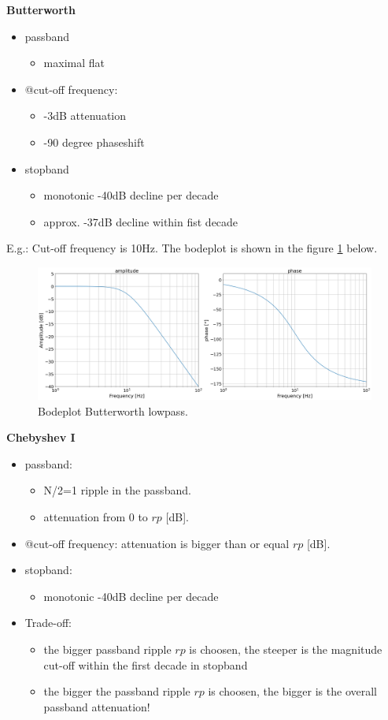 
\textbf{Butterworth}
\begin{itemize}
    \item passband
    \begin{itemize}
        \item maximal flat
    \end{itemize}
    \item @cut-off frequency:
    \begin{itemize}
        \item -3dB attenuation
        \item -90 degree phaseshift
    \end{itemize}
    \item stopband 
    \begin{itemize}
        \item monotonic -40dB decline per decade
        \item approx. -37dB decline within fist decade
    \end{itemize} 
\end{itemize}

E.g.: Cut-off frequency is 10Hz. The bodeplot is shown in the figure \ref{fig:lp_butter} below.
\begin{figure}[h!]
  \includegraphics[width=0.75\linewidth]{lp_butter.png}
  \caption{Bodeplot Butterworth lowpass.}
  \label{fig:lp_butter}
\end{figure}
	
\textbf{Chebyshev I}\\
\begin{itemize}
    \item passband:
    \begin{itemize}
        \item N/2=1 ripple in the passband.
        \item attenuation from 0 to $rp$ [dB].
    \end{itemize}
    \item @cut-off frequency: attenuation is bigger than or equal $rp$ [dB].
    \item stopband:
    \begin{itemize}
        \item monotonic -40dB decline per decade
    \end{itemize}
    \item Trade-off:
    \begin{itemize}
        \item the bigger passband ripple $rp$ is choosen, the steeper is the magnitude cut-off within the first decade in stopband 
        \item the bigger the passband ripple $rp$ is choosen, the bigger is the overall passband attenuation!
    \end{itemize}
\end{itemize}

